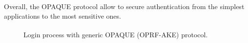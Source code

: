 \documentclass[../report.tex]{subfiles}
\begin{document}
Overall, the OPAQUE protocol allow to secure authentication from the simplest applications to the most sensitive ones.


% 
% 
% 


\paragraph{}

\begin{figure}[h]
 \centering

 \setlength{\fboxsep}{10pt}
 \setlength{\fboxrule}{1pt}

 \caption{Login process with generic OPAQUE (OPRF-AKE) protocol.}
 \label{fig:OPAQUE_AKE}
\end{figure}
\end{document}
